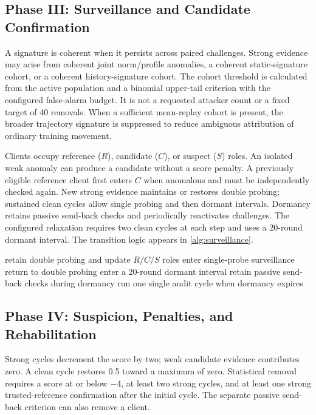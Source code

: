 \documentclass[conference]{IEEEtran}
\begin{document}
\subsection{Phase III: Surveillance and Candidate Confirmation}
A signature is coherent when it persists across paired challenges. Strong evidence may arise from coherent joint norm/profile anomalies, a coherent static-signature cohort, or a coherent history-signature cohort. The cohort threshold is calculated from the active population and a binomial upper-tail criterion with the configured false-alarm budget. It is not a requested attacker count or a fixed target of 40 removals. When a sufficient mean-replay cohort is present, the broader trajectory signature is suppressed to reduce ambiguous attribution of ordinary training movement.

Clients occupy reference ($R$), candidate ($C$), or suspect ($S$) roles. An isolated weak anomaly can produce a candidate without a score penalty. A previously eligible reference client first enters $C$ when anomalous and must be independently checked again. New strong evidence maintains or restores double probing; sustained clean cycles allow single probing and then dormant intervals. Dormancy retains passive send-back checks and periodically reactivates challenges. The configured relaxation requires two clean cycles at each step and uses a 20-round dormant interval. The transition logic appears in \autoref{alg:surveillance}.

\begin{algorithm}[t]
\caption{Phase III: surveillance and confirmation}
\label{alg:surveillance}
\begin{algorithmic}[1]
 \State retain double probing and update $R/C/S$ roles
 \State enter single-probe surveillance
\EndIf
{}
 \State return to double probing
 \State enter a 20-round dormant interval
\EndIf
\State retain passive send-back checks during dormancy
\State run one single audit cycle when dormancy expires
\end{algorithmic}
\end{algorithm}

\subsection{Phase IV: Suspicion, Penalties, and Rehabilitation}
Strong cycles decrement the score by two; weak candidate evidence contributes zero. A clean cycle restores 0.5 toward a maximum of zero. Statistical removal requires a score at or below $-4$, at least two strong cycles, and at least one strong trusted-reference confirmation after the initial cycle. The separate passive send-back criterion can also remove a client.
\end{document}
